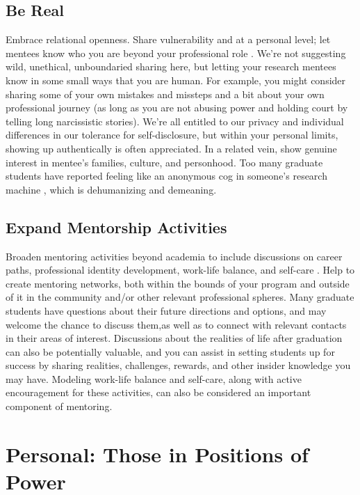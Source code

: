 \documentclass[
  11pt,
]{book}
\begin{document}
\subsection{Be Real}\label{be-real}

Embrace relational openness. Share vulnerability and at a personal level; let mentees know who you are beyond your professional role \citep{kim_putting_2021}. We're not suggesting wild, unethical, unboundaried sharing here, but letting your research mentees know in some small ways that you are human. For example, you might consider sharing some of your own mistakes and missteps and a bit about your own professional journey (as long as you are not abusing power and holding court by telling long narcissistic stories). We're all entitled to our privacy and individual differences in our tolerance for self-disclosure, but within your personal limits, showing up authentically is often appreciated. In a related vein, show genuine interest in mentee's families, culture, and personhood. Too many graduate students have reported feeling like an anonymous cog in someone's research machine \citep{hall_falling_2022}, which is dehumanizing and demeaning.

\subsection{Expand Mentorship Activities}\label{expand-mentorship-activities}

Broaden mentoring activities beyond academia to include discussions on career paths, professional identity development, work-life balance, and self-care \citep{cho_under_2021, kent_recommendations_2022, mangione_mentoring_2018, talusan_identity-conscious_2022}. Help to create mentoring networks, both within the bounds of your program and outside of it in the community and/or other relevant professional spheres. Many graduate students have questions about their future directions and options, and may welcome the chance to discuss them,as well as to connect with relevant contacts in their areas of interest. Discussions about the realities of life after graduation can also be potentially valuable, and you can assist in setting students up for success by sharing realities, challenges, rewards, and other insider knowledge you may have. Modeling work-life balance and self-care, along with active encouragement for these activities, can also be considered an important component of mentoring.

\section{Personal: Those in Positions of Power}\label{personal-those-in-positions-of-power}
\end{document}
